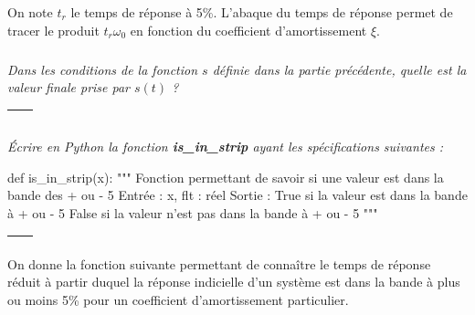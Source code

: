 \documentclass[10pt]{article}
\newif\ifprof
\begin{document}
On note $t_r$  le temps de réponse à 5\%. L'abaque du temps de réponse permet de tracer le produit $t_r\omega_0$ en fonction du coefficient d'amortissement $\xi$.

\subparagraph{}
\textit{Dans les conditions de la fonction $s$ définie dans la partie précédente, quelle est la valeur finale prise par $s(t)$ ?} 
\ifprof
\begin{corrige}
La valeur finale est 1. 
\end{corrige}
\else


\begin{tabular}{|p{}|}
\hline
$$\quad$$ \\
\hline
\end{tabular}
\fi

\subparagraph{}
\textit{Écrire en Python la fonction \textsf{\textbf{is\_in\_strip}} ayant les spécifications suivantes : } 

\begin{py}
\begin{python}
def is_in_strip(x):
    """
    Fonction permettant de savoir si une valeur est dans la bande des + ou - 5%
    Entrée : 
        x, flt : réel
    Sortie : 
        True si la valeur est dans la bande à + ou - 5%
        False si la valeur n'est pas dans la bande à + ou - 5%
    """
\end{python}
\end{py}

\ifprof
\begin{corrige}
\begin{py}
\begin{python}
def trace_s(z):
    x = []
    y = []
    n = 1000
    for i in range(n+1):
        t = 10*i/n
        x.append(t)
        y.append(f_s(t,z))
    plot(x,y)
\end{python}
\end{py}
\end{corrige}
\else


\begin{tabular}{|p{}|}
\hline
$$\quad$$
\vspace{2cm}
$$\quad$$ \\
\hline
\end{tabular}
\fi

\ifprof
\else
\vspace{1cm}

On donne la fonction suivante permettant de connaître le temps de réponse réduit à partir duquel la réponse indicielle d'un système est dans la bande à plus ou moins 5\% pour un coefficient d'amortissement particulier.
\end{document}
